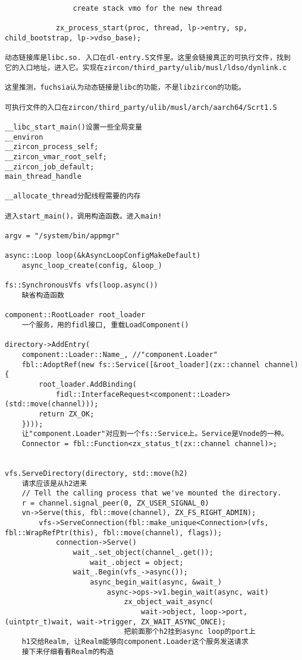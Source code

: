 \begin{verbatim}
                create stack vmo for the new thread

            zx_process_start(proc, thread, lp->entry, sp, child_bootstrap, lp->vdso_base);

动态链接库是libc.so. 入口在dl-entry.S文件里。这里会链接真正的可执行文件，找到
它的入口地址，进入它。实现在zircon/third_party/ulib/musl/ldso/dynlink.c

这里推测，fuchsia认为动态链接是libc的功能，不是libzircon的功能。

可执行文件的入口在zircon/third_party/ulib/musl/arch/aarch64/Scrt1.S

__libc_start_main()设置一些全局变量
__environ
__zircon_process_self;
__zircon_vmar_root_self;
__zircon_job_default;
main_thread_handle

__allocate_thread分配线程需要的内存

进入start_main()，调用构造函数。进入main!

argv = "/system/bin/appmgr"

async::Loop loop(&kAsyncLoopConfigMakeDefault)
    async_loop_create(config, &loop_)
    
fs::SynchronousVfs vfs(loop.async())
    缺省构造函数

component::RootLoader root_loader
    一个服务，用的fidl接口, 重载LoadComponent()

directory->AddEntry(
    component::Loader::Name_, //"component.Loader"
    fbl::AdoptRef(new fs::Service([&root_loader](zx::channel channel) {
        root_loader.AddBinding(
            fidl::InterfaceRequest<component::Loader>(std::move(channel)));
        return ZX_OK;
    })));
    让"component.Loader"对应到一个fs::Service上。Service是Vnode的一种。
    Connector = fbl::Function<zx_status_t(zx::channel channel)>;


vfs.ServeDirectory(directory, std::move(h2)
    请求应该是从h2进来
    // Tell the calling process that we've mounted the directory.
    r = channel.signal_peer(0, ZX_USER_SIGNAL_0)
    vn->Serve(this, fbl::move(channel), ZX_FS_RIGHT_ADMIN);
        vfs->ServeConnection(fbl::make_unique<Connection>(vfs, fbl::WrapRefPtr(this), fbl::move(channel), flags));
            connection->Serve()
                wait_.set_object(channel_.get());
                    wait_.object = object;
                wait_.Begin(vfs_->async());
                    async_begin_wait(async, &wait_)
                        async->ops->v1.begin_wait(async, wait)
                            zx_object_wait_async(
                                wait->object, loop->port, (uintptr_t)wait, wait->trigger, ZX_WAIT_ASYNC_ONCE);
                            把前面那个h2挂到async loop的port上
    h1交给Realm, 让Realm能够向component.Loader这个服务发送请求
    接下来仔细看看Realm的构造


\end{verbatim}
